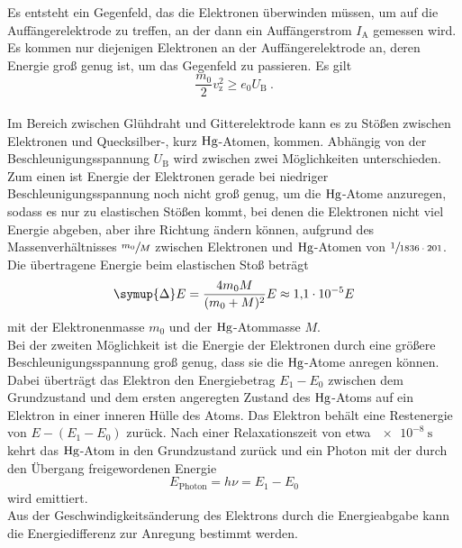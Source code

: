     Es entsteht ein Gegenfeld,
    das die Elektronen überwinden müssen,
    um auf die Auffängerelektrode zu treffen,
    an der dann ein Auffängerstrom $I_\text{A}$ gemessen wird.
    Es kommen nur diejenigen Elektronen an der Auffängerelektrode an,
    deren Energie groß genug ist,
    um das Gegenfeld zu passieren.
    Es gilt
    \begin{equation}
        \frac{m_0}{2}v^2_\text{z} \geq e_0 U_\text{B} \ .
        \label{eqn:energie_gegenfeld}
    \end{equation}
    \\
    Im Bereich zwischen Glühdraht und Gitterelektrode kann es zu Stößen zwischen Elektronen und Quecksilber-,
    kurz $\ce{Hg}$-Atomen,
    kommen.
    Abhängig von der Beschleunigungsspannung $U_\text{B}$ wird zwischen zwei Möglichkeiten unterschieden.\\
    \indent
    Zum einen ist Energie der Elektronen gerade bei niedriger Beschleunigungsspannung noch nicht groß genug,
    um die $\ce{Hg}$-Atome anzuregen,
    sodass es nur zu elastischen Stößen kommt,
    bei denen die Elektronen nicht viel Energie abgeben,
    aber ihre Richtung ändern können,
    aufgrund des Massenverhältnisses $\sfrac{m_0}{M}$ zwischen Elektronen und $\ce{Hg}$-Atomen von $\sfrac{1}{1836\cdot201}$.
    Die übertragene Energie beim elastischen Stoß beträgt
    \begin{equation*}
        \symup{\Delta}E = \frac{4 m_0 M}{(m_0 + M)^2} E \approx \num{1.1e-5} E
    \end{equation*}
    mit der Elektronenmasse $m_0$ und der $\ce{Hg}$-Atommasse $M$.\\
    \indent
    Bei der zweiten Möglichkeit ist die Energie der Elektronen durch eine größere Beschleunigungsspannung groß genug,
    dass sie die $\ce{Hg}$-Atome anregen können.
    Dabei überträgt das Elektron den Energiebetrag $E_1 -E_0$ zwischen dem Grundzustand und dem ersten angeregten Zustand des $\ce{Hg}$-Atoms auf ein Elektron in einer inneren Hülle des Atoms.
    Das Elektron behält eine Restenergie von $E - (E_1 - E_0)$ zurück.
    Nach einer Relaxationszeit von etwa $\SI{e-8}{\second}$ kehrt das $\ce{Hg}$-Atom in den Grundzustand zurück und ein Photon mit der durch den Übergang freigewordenen Energie
    \begin{equation*}
        E_\text{Photon} = h \nu = E_1 - E_0
    \end{equation*}
    wird emittiert.\\
    Aus der Geschwindigkeitsänderung des Elektrons durch die Energieabgabe kann die Energiedifferenz zur Anregung bestimmt werden.
